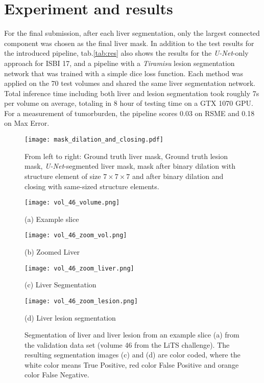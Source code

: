 \documentclass{article}
\begin{document}
\section{Experiment and results}
\label{sec:method}

For the final submission, after each liver segmentation, only the largest connected component was chosen as the final liver mask. In addition to the test results for the introduced pipeline, tab.\ref{tab:res} also shows the results for the \textit{U-Net}-only approach for ISBI 17, and a pipeline with a \textit{Tiramisu} lesion segmentation network that was trained with a simple dice loss function. Each method was applied on the 70 test volumes and shared the same liver segmentation network.
Total inference time including both liver and lesion segmentation took roughly 7s per volume on average, totaling in 8 hour of testing time on a GTX 1070 GPU.
For a measurement of tumorburden, the pipeline scores 0.03 on RSME and 0.18 on Max Error.

\begin{figure*}[htb]
\texttt{[image: mask\_dilation\_and\_closing.pdf]}
\caption{From left to right: Ground truth liver mask, Ground truth lesion mask, \textit{U-Net}-segmented liver mask, mask after binary dilation with structure element of size $7\times 7\times 7$ and after binary dilation and closing with same-sized structure elements.}
\label{fig:bad_seg}
\end{figure*}




\begin{figure}[t]
\begin{minipage}[b]{0.48\linewidth}
  \centering
  \centerline{\texttt{[image: vol\_46\_volume.png]}}
\centerline{(a) Example slice}\medskip
\end{minipage}
\hfill
\begin{minipage}[b]{0.48\linewidth}
  \centering
  \centerline{\texttt{[image: vol\_46\_zoom\_vol.png]}}
\centerline{(b) Zoomed Liver}\medskip
\end{minipage}
\hfill
\begin{minipage}[b]{.48\linewidth}
  \centering
  \centerline{\texttt{[image: vol\_46\_zoom\_liver.png]}}
\centerline{(c) Liver Segmentation}\medskip
\end{minipage}
\hfill
\begin{minipage}[b]{0.48\linewidth}
  \centering
  \centerline{\texttt{[image: vol\_46\_zoom\_lesion.png]}}
\centerline{(d) Liver lesion segmentation}\medskip
\end{minipage}
\caption{Segmentation of liver and liver lesion from an example slice (a) from the validation data set (volume 46 from the LiTS challenge). The resulting segmentation images (c) and (d) are color coded, where the white color means True Positive, red color False Positive and orange color False Negative.}
\label{fig:segmentation}
\end{figure}
\end{document}
